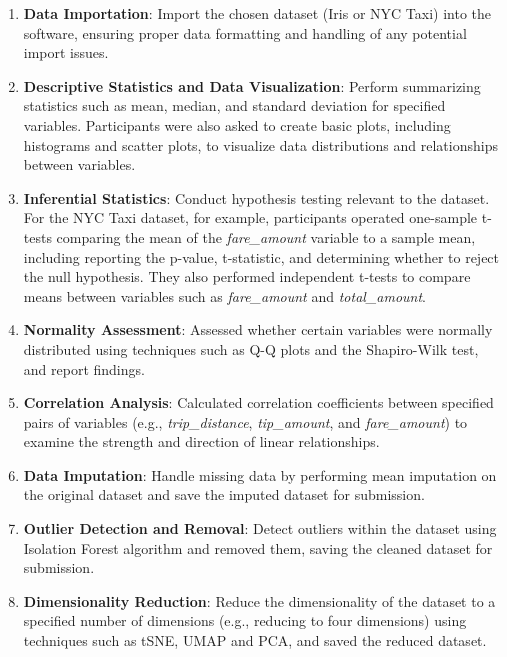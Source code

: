 \documentclass{article}
\begin{document}
\begin{enumerate}
    \item \textbf{Data Importation}: Import the chosen dataset (Iris or NYC Taxi) into the software, ensuring proper data formatting and handling of any potential import issues.

    \item \textbf{Descriptive Statistics and Data Visualization}: Perform summarizing statistics such as mean, median, and standard deviation for specified variables. Participants were also asked to create basic plots, including histograms and scatter plots, to visualize data distributions and relationships between variables.

    \item \textbf{Inferential Statistics}: Conduct hypothesis testing relevant to the dataset. For the NYC Taxi dataset, for example, participants operated one-sample t-tests comparing the mean of the \textit{fare\_amount} variable to a sample mean, including reporting the p-value, t-statistic, and determining whether to reject the null hypothesis. They also performed independent t-tests to compare means between variables such as \textit{fare\_amount} and \textit{total\_amount}.

    \item \textbf{Normality Assessment}: Assessed whether certain variables were normally distributed using techniques such as Q-Q plots and the Shapiro-Wilk test, and report findings.

    \item \textbf{Correlation Analysis}: Calculated correlation coefficients between specified pairs of variables (e.g., \textit{trip\_distance}, \textit{tip\_amount}, and \textit{fare\_amount}) to examine the strength and direction of linear relationships.

    \item \textbf{Data Imputation}: Handle missing data by performing mean imputation on the original dataset and save the imputed dataset for submission.

    \item \textbf{Outlier Detection and Removal}: Detect outliers within the dataset using Isolation Forest algorithm \cite{liu2008isolation} and removed them, saving the cleaned dataset for submission.

    \item \textbf{Dimensionality Reduction}: Reduce the dimensionality of the dataset to a specified number of dimensions (e.g., reducing to four dimensions) using techniques such as tSNE\cite{van2008visualizing}, UMAP\cite{mcinnes2018umap} and PCA\cite{jolliffe2002principal}, and saved the reduced dataset.


\end{enumerate}
\end{document}
